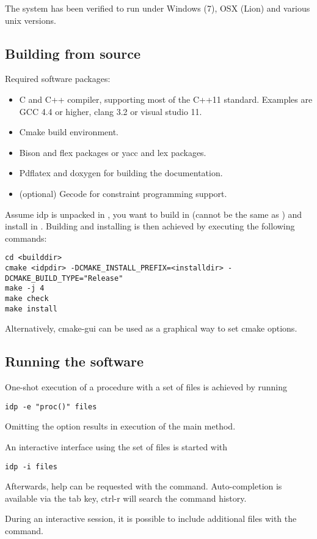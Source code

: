 
The system has been verified to run under Windows (7), OSX (Lion) and various unix versions.

\subsection{Building from source}
Required software packages:
\begin{itemize}
  \item C and C++ compiler, supporting most of the C++11 standard. Examples are GCC 4.4 or higher, clang 3.2 or visual studio 11.
  \item Cmake build environment. 
  \item Bison and flex packages or yacc and lex packages.
  \item Pdflatex and doxygen for building the documentation.
  \item (optional) Gecode for constraint programming support.
\end{itemize}

Assume idp is unpacked in , you want to build in  (cannot be the same as ) and install in . Building and installing is then achieved by executing the following commands:
\begin{lstlisting}
cd <builddir>
cmake <idpdir> -DCMAKE_INSTALL_PREFIX=<installdir> -DCMAKE_BUILD_TYPE="Release"
make -j 4
make check
make install
\end{lstlisting}

Alternatively, cmake-gui can be used as a graphical way to set cmake options.

\subsection{Running the software}
One-shot execution of a procedure  with a set of files  is achieved by running
\begin{lstlisting}
idp -e "proc()" files
\end{lstlisting}
Omitting the  option results in execution of the main method.

An interactive interface using the set of files  is started with 
\begin{lstlisting}
idp -i files
\end{lstlisting}

Afterwards, help can be requested with the  command. Auto-completion is available via the tab key, ctrl-r will search the command history.

During an interactive session, it is possible to include additional files with the  command.
